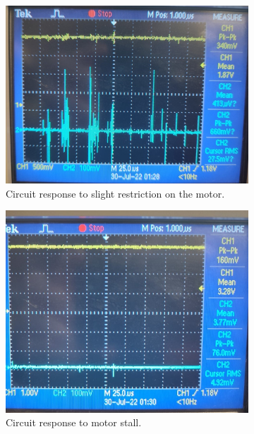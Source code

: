 \begin{figure}[H]
\begin{subfigure}[]{0.3\textwidth}
\includegraphics[width=\linewidth]{./Figures/CurSens_Prac_Slight.jpeg}
\caption{Circuit response to slight restriction on the motor.}
\label{subfig:cursen_prac_slight}	
\end{subfigure}
\vfill
\begin{subfigure}[]{0.3\textwidth}
\includegraphics[width=\linewidth]{./Figures/CurSens_Prac_Stall.jpeg}
\caption{Circuit response to motor stall.}
\label{subfig:cursen_prac_stall}	
\end{subfigure}
\hfill
\begin{subfigure}[]{0.3\textwidth}

\end{subfigure}
\end{figure}
